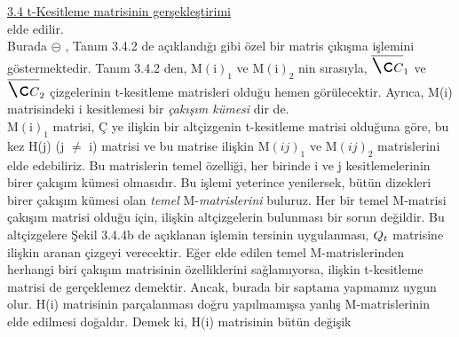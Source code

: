 \documentclass[12pt]{article}
\begin{document}

	\underline{3.4 t-Kesitleme matrisinin gerşekleştirimi} \\

	elde edilir. \\

	Burada $\circleddash$ , Tanım 3.4.2 de açıklandığı gibi özel bir matris çıkışma işlemini göstermektedir. Tanım 3.4.2 den, {\LARGE M}$(\text{i})_{1}$ ve 	{\LARGE M}$(\text{i})_{2}$ nin sırasıyla, $\overline{{\LARGE Ç}}_{1}$ ve $\overline{{\LARGE Ç}}_{2}$ çizgelerinin t-kesitleme matrisleri olduğu hemen görülecektir. Ayrıca, {\LARGE M}(i) matrisindeki i kesitlemesi bir \textit{çakışım kümesi} dir de. \\

	{\LARGE M}$(\text{i})_{1}$ matrisi, {\LARGE Ç} ye ilişkin bir altçizgenin t-kesitleme matrisi olduğuna göre, bu kez {\LARGE H}(j) (j $\neq$ i) matrisi ve bu matrise ilişkin {\LARGE M}$(ij)_{1}$ ve  {\LARGE M}$(ij)_{2}$ matrislerini elde edebiliriz. Bu matrislerin temel özelliği, her birinde i ve j kesitlemelerinin birer çakışım kümesi olmasıdır. Bu işlemi yeterince yenilersek, bütün dizekleri birer çakışım kümesi olan \emph{temel} {\LARGE M}-\emph{matrislerini} buluruz. Her bir temel {\LARGE M}-matrisi çakışım matrisi olduğu için, ilişkin altçizgelerin bulunması bir sorun değildir. Bu altçizgelere Şekil 3.4.4b de açıklanan işlemin tersinin uygulanması, ${\LARGE Q}_{t}$ matrisine ilişkin aranan çizgeyi verecektir. Eğer elde edilen temel {\LARGE M}-matrislerinden herhangi biri çakışım matrisinin özelliklerini sağlamıyorsa, ilişkin t-kesitleme matrisi de gerçeklemez demektir. Ancak, burada bir saptama yapmamız uygun olur. {\LARGE H}(i) matrisinin parçalanması doğru yapılmamışsa yanlış {\LARGE M}-matrislerinin elde edilmesi doğaldır. Demek ki, {\LARGE H}(i) matrisinin bütün değişik
\end{document}
